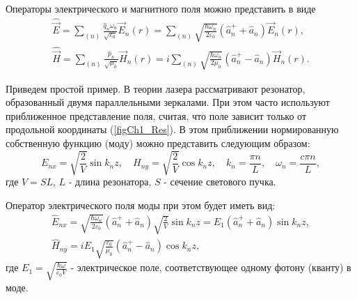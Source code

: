 Операторы электрического и магнитного поля можно представить в виде
\begin{eqnarray}
\hat{\vec{E}} = \sum_{(n)}\frac{\hat{q}_n
  \omega_n}{\sqrt{\varepsilon_0}} \vec{E}_n\left(r\right) = 
\sum_{(n)}\sqrt{\frac{\hbar \omega_n}{2 \varepsilon_0}}
\left(\hat{a}_n^{+} + \hat{a}_n \right)
\vec{E}_n\left(r\right),
\nonumber \\
\hat{\vec{H}} = \sum_{(n)}\frac{\hat{p}_n}
{\sqrt{\mu_0}} \vec{H}_n\left(r\right) = 
i \sum_{(n)}\sqrt{\frac{\hbar \omega_n}{2 \mu_0}}
\left(\hat{a}_n^{+} - \hat{a}_n \right)
\vec{H}_n\left(r\right).
\end{eqnarray}

Приведем простой пример. В теории лазера рассматривают резонатор,
образованный двумя параллельными зеркалами. При этом часто
используют приближенное представление поля, считая, что поле
зависит только от продольной координаты (\autoref{figCh1_Res}). В
этом приближении нормированную собственную функцию (моду) можно
представить следующим образом: 
\begin{equation}
E_{nx} = \sqrt{\frac{2}{V}} \sin k_n z,
\quad
H_{ny} = \sqrt{\frac{2}{V}} \cos k_n z,
\quad
k_n = \frac{\pi n}{L},
\quad
\omega_n = \frac{c \pi n}{L},
\end{equation}
где  $V = SL$,  $L$ - длина резонатора,  $S$ - сечение светового пучка.



Оператор электрического поля моды при этом будет иметь вид:
\begin{eqnarray}
\hat{E}_{nx} = 
\sqrt{\frac{\hbar \omega_n}{2 \varepsilon_0}}
\left(\hat{a}_n^{+} + \hat{a}_n \right)
\sqrt{\frac{2}{V}} \sin k_n z = 
E_1 \left(\hat{a}_n^{+} + \hat{a}_n \right) \sin k_n z, 
\nonumber \\
\hat{H}_{ny} = i E_1 \sqrt{\frac{\varepsilon_0}{\mu_0}}
\left(\hat{a}_n^{+} - \hat{a}_n \right) \cos k_n z,
\label{eqCh1_EH_simple}
\end{eqnarray}
где 
$E_1 = \sqrt{\frac{\hbar \omega}{\varepsilon_0 V}}$ - 
электрическое поле, соответствующее одному фотону (кванту) в
моде. 
